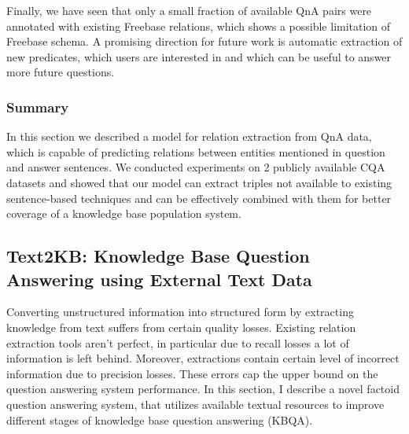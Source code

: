 Finally, we have seen that only a small fraction of available QnA pairs were annotated with existing Freebase relations, which shows a possible limitation of Freebase schema.
A promising direction for future work is automatic extraction of new predicates, which users are interested in and which can be useful to answer more future questions.

\subsubsection{Summary}
\label{section:factoid:approaches:cqarelextract:summary}

In this section we described a model for relation extraction from QnA data, which is capable of predicting relations between entities mentioned in question and answer sentences.
We conducted experiments on 2 publicly available CQA datasets and showed that our model can extract triples not available to existing sentence-based techniques and can be effectively combined with them for better coverage of a knowledge base population system.



\subsection{Text2KB: Knowledge Base Question Answering using External Text Data}
\label{section:factoid:approaches:text2kb}

Converting unstructured information into structured form by extracting knowledge from text suffers from certain quality losses.
Existing relation extraction tools aren't perfect, in particular due to recall losses a lot of information is left behind.
Moreover, extractions contain certain level of incorrect information due to precision losses.
These errors cap the upper bound on the question answering system performance.
In this section, I describe a novel factoid question answering system, that utilizes available textual resources to improve different stages of knowledge base question answering (KBQA).

